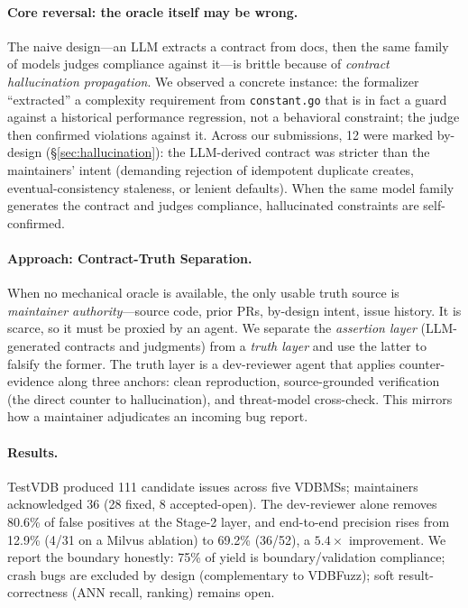 \documentclass[sigconf, anonymous, review]{acmart}
\begin{document}
\paragraph{Core reversal: the oracle itself may be wrong.}
The naive design---an LLM extracts a contract from docs, then the same family of models judges compliance against it---is brittle because of \emph{contract hallucination propagation}. We observed a concrete instance: the formalizer ``extracted'' a complexity requirement from \texttt{constant.go} that is in fact a guard against a historical performance regression, not a behavioral constraint; the judge then confirmed violations against it. Across our submissions, 12 were marked by-design (\S\ref{sec:hallucination}): the LLM-derived contract was stricter than the maintainers' intent (demanding rejection of idempotent duplicate creates, eventual-consistency staleness, or lenient defaults). When the same model family generates the contract and judges compliance, hallucinated constraints are self-confirmed.

\paragraph{Approach: Contract-Truth Separation.}
When no mechanical oracle is available, the only usable truth source is \emph{maintainer authority}---source code, prior PRs, by-design intent, issue history. It is scarce, so it must be proxied by an agent. We separate the \emph{assertion layer} (LLM-generated contracts and judgments) from a \emph{truth layer} and use the latter to falsify the former. The truth layer is a dev-reviewer agent that applies counter-evidence along three anchors: clean reproduction, source-grounded verification (the direct counter to hallucination), and threat-model cross-check. This mirrors how a maintainer adjudicates an incoming bug report.

\paragraph{Results.}
TestVDB produced 111 candidate issues across five VDBMSs; maintainers acknowledged 36 (28 fixed, 8 accepted-open). The dev-reviewer alone removes 80.6\% of false positives at the Stage-2 layer, and end-to-end precision rises from 12.9\% (4/31 on a Milvus ablation) to 69.2\% (36/52), a $5.4\times$ improvement. We report the boundary honestly: 75\% of yield is boundary/validation compliance; crash bugs are excluded by design (complementary to VDBFuzz); soft result-correctness (ANN recall, ranking) remains open.
\end{document}
